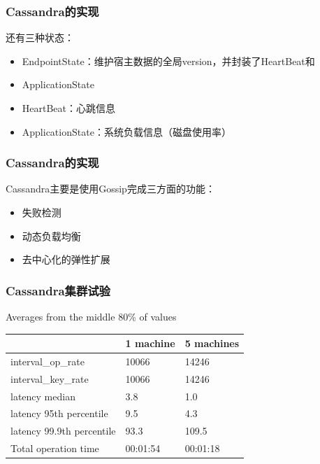 \documentclass[slidestop,compress,mathserif,c]{beamer}
\begin{document}
\begin{frame}
\frametitle{Cassandra的实现}
 还有三种状态：
 \begin{itemize}
\item EndpointState：维护宿主数据的全局version，并封装了HeartBeat和\item ApplicationState
\item HeartBeat：心跳信息
\item ApplicationState：系统负载信息（磁盘使用率）
 \end{itemize}
\end{frame}



\begin{frame}
\frametitle{Cassandra的实现}
 Cassandra主要是使用Gossip完成三方面的功能：
\begin{itemize}
\item 失败检测
\item 动态负载均衡
\item 去中心化的弹性扩展
\end{itemize}
\end{frame}

\begin{frame}
\frametitle{Cassandra集群试验}
\begin{center}
  Averages from the middle 80\% of values
\begin{tabular}{|l|l|l|}\hline
  & 1 machine& 5 machines\\\hline
  interval\_op\_rate          & 10066  & 14246\\\hline
  interval\_key\_rate         & 10066  & 14246\\\hline
  latency median            & 3.8  & 1.0\\\hline
  latency 95th percentile   & 9.5  & 4.3\\\hline
  latency 99.9th percentile & 93.3  & 109.5\\\hline
  Total operation time      & 00:01:54     & 00:01:18\\\hline
\end{tabular}
\end{center}
\end{frame}
\end{document}
